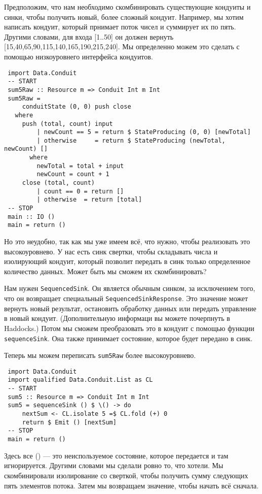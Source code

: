 {Предположим, что нам необходимо скомбинировать существующие кондуиты  и  синки, 
чтобы получить новый, более сложный кондуит. Например, мы хотим написать кондуит, 
который прнимает поток чисел и суммирует их по пять. Другими словами, для входа 
[1..50] он должен вернуть [15,40,65,90,115,140,165,190,215,240]. Мы определенно 
можем это сделать с помощью низкоуровнего интерфейса кондуитов.
\begin{lstlisting}
 import Data.Conduit
 -- START
 sum5Raw :: Resource m => Conduit Int m Int
 sum5Raw =
     conduitState (0, 0) push close
   where
     push (total, count) input
         | newCount == 5 = return $ StateProducing (0, 0) [newTotal]
         | otherwise     = return $ StateProducing (newTotal, newCount) []
       where
         newTotal = total + input
         newCount = count + 1
     close (total, count)
         | count == 0 = return []
         | otherwise  = return [total]
 -- STOP
 main :: IO ()
 main = return ()
\end{lstlisting}
Но это неудобно, так как мы уже имеем всё, что нужно, чтобы реализовать это 
высокоуровнево. У нас есть синк свертки, чтобы складывать числа и изолирующий 
кондуит, который позволит передать в синк только определенное количество данных. 
Может быть мы сможем их скомбинировать?
 
Нам нужен \lstinline'SequencedSink'. Он является обычным синком, за исключением 
того, что он возвращает специальный \lstinline'SequencedSinkResponse'. Это 
значение может вернуть новый результат, остановить обработку данных или передать 
управление в новый кондуит. (Дополнительную информаци вы можете почерпнуть 
в Haddocks.) Потом мы сможем преобразовать это в кондуит с помощью функции 
\lstinline'sequenceSink'. Она также принимает состояние, которое будет 
передано в синк.
 
Теперь мы можем переписать \lstinline'sum5Raw' более высокоуровнево.
\begin{lstlisting}
 import Data.Conduit
 import qualified Data.Conduit.List as CL
 -- START
 sum5 :: Resource m => Conduit Int m Int
 sum5 = sequenceSink () $ \() -> do
     nextSum <- CL.isolate 5 =$ CL.fold (+) 0
     return $ Emit () [nextSum]
 -- STOP
 main = return ()
\end{lstlisting}
Здесь все () --- это  неиспользуемое состояние, которое передается и там 
игнорируется. Другими словами мы сделали ровно то, что хотели. Мы скомбинировали 
изолирование со сверткой, чтобы получить сумму следующих пять элементов потока. 
Затем мы возвращаем значение, чтобы начать всё сначала.
 
}
